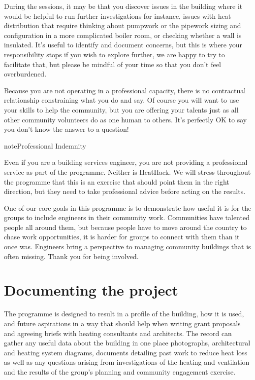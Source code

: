 \documentclass[letterpaper,10pt,english]{jupyterBook}
\begin{document}
\sphinxAtStartPar
During the sessions, it may be that you discover issues in the building where it would be helpful to run further investigations \sphinxhyphen{} for instance, issues with heat distribution that require thinking about pumpwork or the pipework sizing and configuration in a more complicated boiler room, or checking whether a wall is insulated.  It’s useful to identify and document concerns, but this is where your responsibility stops \sphinxhyphen{} if you wish to explore further, we are happy to try to facilitate that, but please be mindful of your time so that you don’t feel overburdened.

\sphinxAtStartPar
Because you are not operating in a professional capacity, there is no contractual relationship constraining what you do and say.  Of course you will want to use your skills to help the community, but you are offering your talents just as all other community volunteers do \sphinxhyphen{} as one human to others. It’s perfectly OK to say you don’t know the answer to a question!

\begin{sphinxadmonition}{note}{Professional Indemnity}

\sphinxAtStartPar
Even if you are a building services engineer, you are not providing a professional service as part of the programme.  Neither is HeatHack.  We will stress throughout the programme that this is an exercise that should point them in the right direction, but they need to take professional advice before acting on the results.
\end{sphinxadmonition}

\sphinxAtStartPar
One of our core goals in this programme is to demonstrate how useful it is for the groups to include engineers in their community work.   Communities have talented people all around them, but because people have to move around the country to chase work opportunities, it is harder for groups to connect with them than it once was.   Engineers bring a perspective to managing community buildings that is often missing.   Thank you for being involved.

\sphinxstepscope


\chapter{Documenting the project}
\label{\detokenize{profile:documenting-the-project}}\label{\detokenize{profile::doc}}
\sphinxAtStartPar
The programme is designed to result in a profile of the building, how it is used, and future aspirations in a way that should help when writing grant proposals and agreeing briefs with heating consultants and architects.   The record can gather any useful data about the building in one place \sphinxhyphen{} photographs, architectural and heating system diagrams, documents detailing past work to reduce heat loss \sphinxhyphen{} as well as any questions arising from investigations of the heating and ventilation and the results of the group’s planning and community engagement exercise.
\end{document}
